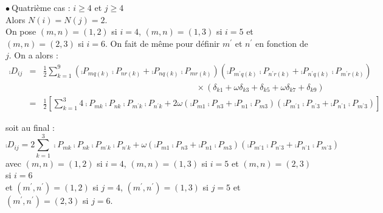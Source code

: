\vspace{1cm}
$\bullet\ ${\sc Quatri\`eme cas} : $i\geqslant 4$ et $j\geqslant 4$\\
Alors $N(i)=N(j)=2$.\\
On pose $(m,n)=(1,2)$ si $i=4$, $(m,n)=(1,3)$ si $i=5$ et
$(m,n)=(2,3)$ si $i=6$. On fait de m\^eme pour d\'efinir $m^\prime$ et
$n^\prime$ en fonction de $j$. On a alors :
\begin{eqnarray}
\comp{D}_{ij}&=&\frac{1}{2}\sum_{k=1}^9
\left(\comp{P}_{mq(k)}\comp{P}_{nr(k)}+\comp{P}_{nq(k)}\comp{P}_{mr(k)}\right)
\left(\comp{P}_{m^\prime q(k)}\comp{P}_{n^\prime r(k)}
+\comp{P}_{n^\prime q(k)}\comp{P}_{m^\prime r(k)}\right)\nonumber\\
&&\qquad\qquad\qquad\qquad\qquad\qquad\qquad\qquad\qquad\times
(\delta_{k1}+\omega\delta_{k3}+\delta_{k5}+\omega\delta_{k7}+\delta_{k9})\nonumber\\
&=&\frac{1}{2}\left[
\sum_{k=1}^3 4\comp{P}_{mk}\comp{P}_{nk}
\comp{P}_{m^\prime k}\comp{P}_{n^\prime k}
+2\omega\left(\comp{P}_{m1}\comp{P}_{n3}+\comp{P}_{n1}\comp{P}_{m3}\right)
\left(\comp{P}_{m^\prime 1}\comp{P}_{n^\prime 3}
+\comp{P}_{n^\prime 1}\comp{P}_{m^\prime 3}\right)\right]
\end{eqnarray}

soit au final :
\begin{equation}
\comp{D}_{ij}=
2\sum_{k=1}^3 \comp{P}_{mk}\comp{P}_{nk}
\comp{P}_{m^\prime k}\comp{P}_{n^\prime k}
+\omega\left(\comp{P}_{m1}\comp{P}_{n3}+\comp{P}_{n1}\comp{P}_{m3}\right)
\left(\comp{P}_{m^\prime 1}\comp{P}_{n^\prime 3}
+\comp{P}_{n^\prime 1}\comp{P}_{m^\prime 3}\right)
\end{equation}
avec $(m,n)=(1,2)$ si $i=4$, $(m,n)=(1,3)$ si $i=5$ et $(m,n)=(2,3)$ si
$i=6$\\
et $(m^\prime ,n^\prime )=(1,2)$ si $j=4$, $(m^\prime ,n^\prime )=(1,3)$
si $j=5$ et $(m^\prime ,n^\prime )=(2,3)$ si $j=6$.


